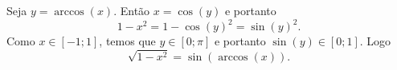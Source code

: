 Seja $y=\arccos(x)$.
Então $x=\cos(y)$ e portanto
\[
	1-x^2=1-\cos(y)^2=\sin(y)^2.
\]
Como $x\in[-1;1]$, temos que $y\in[0;\pi]$ e portanto $\sin(y)\in[0;1]$.
Logo
\[
	\sqrt{1-x^2}=\sin(\arccos(x)).
\]
